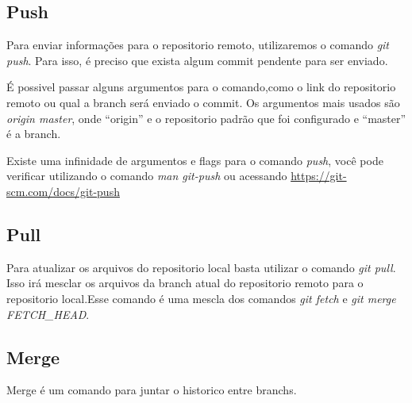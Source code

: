 \documentclass[]{article}
\begin{document}
\subsection*{Push}
Para enviar informações para o repositorio remoto, utilizaremos o comando \textit{git push}. Para isso, é preciso que exista algum commit pendente para ser enviado.

É possivel passar alguns argumentos para o comando,como o link do repositorio remoto ou qual a branch será enviado o commit.
Os argumentos mais usados são \textit{origin master}, onde ``origin'' e o repositorio padrão que foi configurado e ``master'' é a branch.

Existe uma infinidade de argumentos e flags para o comando \textit{push}, você pode verificar utilizando o comando \textit{man git-push} ou acessando \url{https://git-scm.com/docs/git-push}

\subsection*{Pull}

Para atualizar os arquivos do repositorio local basta utilizar o comando \textit{git pull}. 
Isso irá mesclar os arquivos da branch atual do repositorio remoto para o repositorio local.Esse comando é uma mescla dos comandos 
\textit{git fetch} e \textit{git merge FETCH\_HEAD}.

\subsection*{Merge}

Merge é um comando para juntar o historico entre branchs.











\printbibliography 
\end{document}
